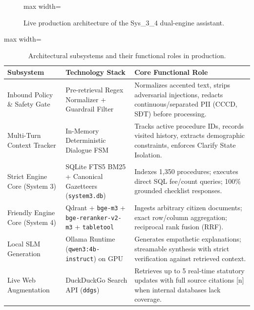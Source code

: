 \documentclass[11pt,a4paper]{article}
\newcommand{\sys}{\mbox{Sys\_3\_4}}
\begin{document}
\begin{figure}[htbp]
\begin{adjustbox}{max width=\textwidth}
\end{adjustbox}
\caption{Live production architecture of the \sys{} dual-engine assistant.}
\label{fig:arch}
\end{figure}

\begin{table}[htbp]
\centering
\caption{Architectural subsystems and their functional roles in production.}
\small
\begin{adjustbox}{max width=\textwidth}
\begin{tabular}{@{}p{3.4cm}p{4.2cm}p{6.2cm}@{}}
\toprule
\textbf{Subsystem} & \textbf{Technology Stack} & \textbf{Core Functional Role}\\
\midrule
Inbound Policy \& Safety Gate & Pre-retrieval Regex Normalizer + Guardrail Filter & Normalizes accented
text, strips adversarial injections, redacts continuous/separated PII (CCCD, SĐT) before processing.\\
Multi-Turn Context Tracker & In-Memory Deterministic Dialogue FSM & Tracks active procedure IDs, records
visited history, extracts demographic constraints, enforces Clarify State Isolation.\\
Strict Engine Core (System 3) & SQLite FTS5 BM25 + Canonical Gazetteers (\texttt{system3.db}) & Indexes
1,350 procedures; executes direct SQL fee/count queries; 100\% grounded checklist responses.\\
Friendly Engine Core (System 4) & Qdrant + \texttt{bge-m3} + \texttt{bge-reranker-v2-m3} + \texttt{tabletool}
& Ingests arbitrary citizen documents; exact row/column aggregation; reciprocal rank fusion (RRF).\\
Local SLM Generation & Ollama Runtime (\texttt{qwen3:4b-instruct}) on GPU & Generates empathetic
explanations; streamable synthesis with strict verification against retrieved context.\\
Live Web Augmentation & DuckDuckGo Search API (\texttt{ddgs}) & Retrieves up to 5 real-time statutory
updates with full source citations [n] when internal databases lack coverage.\\
\bottomrule
\end{tabular}
\end{adjustbox}
\end{table}
\end{document}

